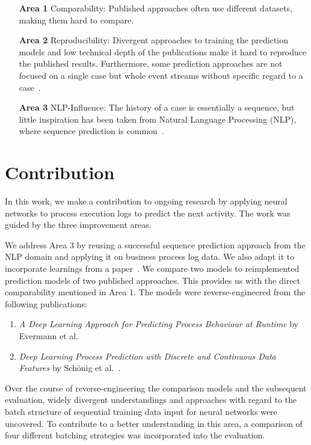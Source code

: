 \begin{enumerate}
    \item[\textbf{Area 1}] Comparability: Published approaches often use different datasets, making them hard to compare.
    \item[\textbf{Area 2}] Reproducibility: Divergent approaches to training the prediction models and low technical depth of the publications make it hard to reproduce the published results. Furthermore, some prediction approaches are not focused on a single case but whole event streams without specific regard to a case~\cite{evermann2016, schoenig2018}.
    \item[\textbf{Area 3}] NLP-Influence: The history of a case is essentially a sequence, but little inspiration has been taken from Natural Language Processing (NLP), where sequence prediction is common~\cite{shibata2016bipartite}.
\end{enumerate}

\section{Contribution}\label{sec:intro:contribution}
In this work, we make a contribution to ongoing research by applying neural networks to process execution logs to predict the next activity. The work was guided by the three improvement areas.

We address Area 3 by reusing a successful sequence prediction approach from the NLP domain and applying it on business process log data. We also adapt it to incorporate learnings from a paper~\cite{klinkmuller2018reliablemonitoring}. We compare two models to reimplemented prediction models of two published approaches. This provides us with the direct comparability mentioned in Area 1. The models were reverse-engineered from the following publications:

\begin{enumerate}
    \item\textit{A Deep Learning Approach for Predicting Process Behaviour at Runtime} by Evermann et al.~\cite{evermann2016}
    \item\textit{Deep Learning Process Prediction with Discrete and Continuous Data Features} by Schönig et al.~\cite{schoenig2018}.
\end{enumerate}

Over the course of reverse-engineering the comparison models and the subsequent evaluation, widely divergent understandings and approaches with regard to the batch structure of sequential training data input for neural networks were uncovered. To contribute to a better understanding in this area, a comparison of four different batching strategies was incorporated into the evaluation.

